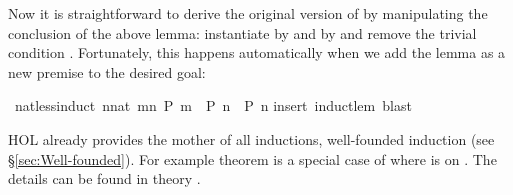 \begin{isabellebody}
\begin{isamarkuptext}
Now it is straightforward to derive the original version of
 by manipulating the conclusion of the above
lemma: instantiate  by  and  by 
and remove the trivial condition . Fortunately, this
happens automatically when we add the lemma as a new premise to the
desired goal:%
\end{isamarkuptext}%
\isamarkuptrue%
\isamarkupfalse%
\ nat{}less{}induct{}\ {}{}{}n{}{}nat{}\ {}m{}n{}\ P\ m\ {}\ P\ n{}\ {}\ P\ n{}\isanewline
%
\isadelimproof
%
\endisadelimproof
%
\isatagproof
{}\isamarkupfalse%
{}insert\ induct{}lem{}\ blast{}%
\endisatagproof
{\isafoldproof}%
%
\isadelimproof
%
\endisadelimproof
%
\begin{isamarkuptext}%
HOL already provides the mother of
all inductions, well-founded induction (see \S\ref{sec:Well-founded}).  For
example theorem  is
a special case of  where  is  on
. The details can be found in theory .%
\end{isamarkuptext}%
\isamarkuptrue%
%
\isadelimtheory
%
\endisadelimtheory
%
\isatagtheory
%
\endisatagtheory
{\isafoldtheory}%
%
\isadelimtheory
%
\endisadelimtheory
\end{isabellebody}%
